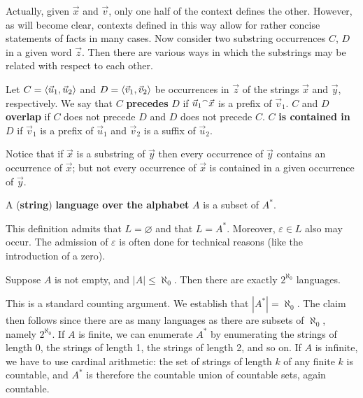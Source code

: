 Actually, given $\vec{x}$ and $\vec{v}$, only one half of the
context defines the other. However, as will become clear, contexts
defined in this way allow for rather concise statements of facts
in many cases. Now consider two substring occurrences $C$, $D$ in
a given word $\vec{z}$. Then there are various ways in which the
substrings may be related with respect to each other.
\begin{defn}
Let $C = \langle \vec{u}_1, \vec{u}_2\rangle$ and $D = \langle \vec{v}_1,
\vec{v}_2\rangle$ be occurrences in $\vec{z}$ of the strings $\vec{x}$ 
and $\vec{y}$, respectively. We say that $C$ 
\textbf{precedes} $D$ 
if $\vec{u}_1{^{\smallfrown}}\vec{x}$ is a prefix of $\vec{v}_1$. $C$ and $D$ 
\textbf{overlap} if $C$ does not precede $D$ and $D$ does not precede 
$C$. $C$ \textbf{is contained in} $D$ if $\vec{v}_1$ is a prefix of 
$\vec{u}_1$ and $\vec{v}_2$ is a suffix of $\vec{u}_2$.
\end{defn}
%
Notice that if $\vec{x}$ is a substring of $\vec{y}$ then every
occurrence of $\vec{y}$ contains an occurrence of $\vec{x}$; but
not every occurrence of $\vec{x}$ is contained in a given
occurrence of $\vec{y}$.
%
\begin{defn}
\label{defn:sprache} %
A (\textbf{string}) \textbf{language over the
alphabet} $A$ is a subset of $A^{\ast}$.
\end{defn}
This definition admits that $L = \varnothing$ and that $L = A^{\ast}$.
Moreover, $\varepsilon \in L$ also may occur. The admission of
$\varepsilon$ is often done for technical reasons (like the
introduction of a zero). 
\begin{thm}
Suppose $A$ is not empty, and $|A| \leq \aleph_0$. Then there are 
exactly $2^{\aleph_0}$ languages.
\end{thm}
\proofbeg
This is a standard counting argument. We establish that $|A^{\ast}| = 
\aleph_0$. The claim then follows since there are as many languages as 
there are subsets of $\aleph_0$, namely $2^{\aleph_0}$. 
If $A$ is finite, we can enumerate $A^{\ast}$ by enumerating the 
strings of length 0, the strings of length 1, the strings of length 2, 
and so on. If $A$ is infinite, we have to use cardinal arithmetic: 
the set of strings of length $k$ of any finite $k$ is countable, 
and $A^{\ast}$ is therefore the countable union of countable sets, 
again countable.
\proofend

